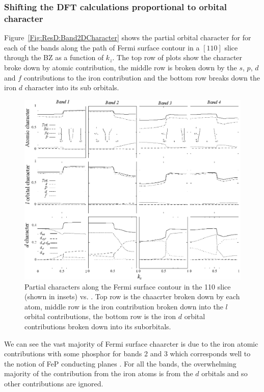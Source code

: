 \subsubsection{Shifting the \ac{DFT} calculations proportional to orbital character}
\label{Sec:ShiftingDFTPropToOrbitalCharacter}

Figure~\ref{Fig:ResD:Band2DCharacter} shows the partial orbital character for for each of the bands along the path of Fermi surface contour in a $[110]$ slice through the \BaFeP \ac{BZ} as a function of $k_z$. The top row of plots show the character broke down by atomic contribution, the middle row is broken down by the $s$, $p$, $d$ and $f$ contributions to the iron contribution and the bottom row breaks down the iron $d$ character into its sub orbitals.
\begin{figure}[htbp]
    \begin{center}
        \includegraphics[scale=0.95]{Chapter-dHvABaFe2P2/Figures/AngleDepMeasurements/BandCharacterVsKz/AllBandCharacterVsKz}
        \caption{Partial characters along the Fermi surface contour in the 110 slice (shown in insets) vs. \kz. Top row is the chaacrter broken down by each atom, middle row is the iron contribution broken down into the $l$ orbital contributions, the bottom row is the iron $d$ orbital contributions broken down into its suborbitals.}
        \label{Fig:ResD:Band2DCharacterVsKz}
    \end{center}
\end{figure}
We can see the vast majority of Fermi surface chaarcter is due to the iron atomic contributions with some phosphor for bands 2 and 3 which corresponds well to the notion of FeP conducting planes . For all the bands, the overwhelming majority of the contribution from the iron atoms is from the $d$ orbitals and so other contributions are ignored.

